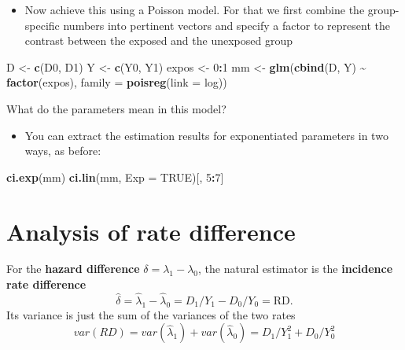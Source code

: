 \documentclass[
]{book}
\newenvironment{Shaded}{\begin{snugshade}}{\end{snugshade}}
\newcommand{\AttributeTok}[1]{\textcolor[rgb]{0.13,0.29,0.53}{#1}}
\newcommand{\ConstantTok}[1]{\textcolor[rgb]{0.56,0.35,0.01}{#1}}
\newcommand{\DecValTok}[1]{\textcolor[rgb]{0.00,0.00,0.81}{#1}}
\newcommand{\FunctionTok}[1]{\textcolor[rgb]{0.13,0.29,0.53}{\textbf{#1}}}
\newcommand{\NormalTok}[1]{#1}
\newcommand{\OtherTok}[1]{\textcolor[rgb]{0.56,0.35,0.01}{#1}}
\newcommand{\SpecialCharTok}[1]{\textcolor[rgb]{0.81,0.36,0.00}{\textbf{#1}}}
\providecommand{\tightlist}{%
  \setlength{\itemsep}{0pt}\setlength{\parskip}{0pt}}
\begin{document}
\begin{itemize}
\tightlist
\item
  Now achieve this using a Poisson model. For that we first combine
  the group-specific numbers into pertinent vectors and specify a factor to represent the contrast between the exposed and the unexposed group
\end{itemize}

\begin{Shaded}
\begin{Highlighting}[]
\NormalTok{D }\OtherTok{\textless{}{-}} \FunctionTok{c}\NormalTok{(D0, D1)}
\NormalTok{Y }\OtherTok{\textless{}{-}} \FunctionTok{c}\NormalTok{(Y0, Y1)}
\NormalTok{expos }\OtherTok{\textless{}{-}} \DecValTok{0}\SpecialCharTok{:}\DecValTok{1}
\NormalTok{mm }\OtherTok{\textless{}{-}} \FunctionTok{glm}\NormalTok{(}\FunctionTok{cbind}\NormalTok{(D, Y) }\SpecialCharTok{\textasciitilde{}} \FunctionTok{factor}\NormalTok{(expos), }\AttributeTok{family =} \FunctionTok{poisreg}\NormalTok{(}\AttributeTok{link =}\NormalTok{ log))}
\end{Highlighting}
\end{Shaded}

What do the parameters mean in this model?

\begin{itemize}
\tightlist
\item
  You can extract the estimation results for exponentiated parameters in two ways, as before:
\end{itemize}

\begin{Shaded}
\begin{Highlighting}[]
\FunctionTok{ci.exp}\NormalTok{(mm)}
\FunctionTok{ci.lin}\NormalTok{(mm, }\AttributeTok{Exp =} \ConstantTok{TRUE}\NormalTok{)[, }\DecValTok{5}\SpecialCharTok{:}\DecValTok{7}\NormalTok{]}
\end{Highlighting}
\end{Shaded}

\section{Analysis of rate difference}\label{analysis-of-rate-difference}

For the \textbf{hazard difference} \(\delta = \lambda_1 - \lambda_0\),
the natural estimator is the \textbf{incidence rate difference}
\[ \widehat\delta = \widehat\lambda_1  - \widehat\lambda_0 = D_1/Y_1 - D_0/Y_0 = \mbox{RD} . \]
Its variance is just the sum of the variances of the two rates
\[ var(RD) = var(\widehat\lambda_1 ) + var( \widehat\lambda_0 ) =  D_1/Y_1^2 + D_0/Y_0^2 \]
\end{document}
